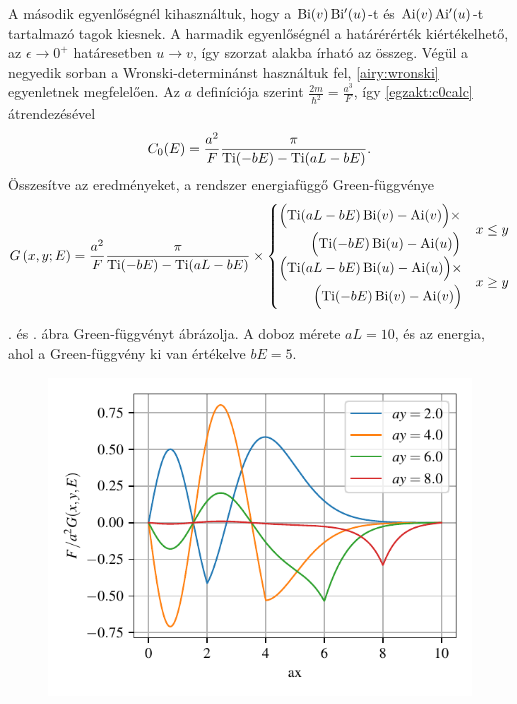 A második egyenlőségnél kihasználtuk, hogy a $\operatorname{Bi}(v)\operatorname{Bi^\prime}(u)$-t és $\operatorname{Ai}(v)\operatorname{Ai^\prime}(u)$-t tartalmazó tagok kiesnek. A harmadik egyenlőségnél a határérérték kiértékelhető, az $\epsilon\to 0^+$ határesetben $u\to v$, így szorzat alakba írható az összeg. Végül a negyedik sorban a Wronski-determinánst használtuk fel, \eqref{airy:wronski} egyenletnek megfelelően. Az $a$ definíciója szerint $\frac{2m}{\hbar^2}=\frac{a^3}{F}$, így \eqref{egzakt:c0calc} átrendezésével
\begin{equation}
	C_0(E) = \frac{a^2}{F}\frac{\pi}{\operatorname{Ti}(-bE)-\operatorname{Ti}(aL-bE)}.
\end{equation}
Összesítve az eredményeket, a rendszer energiafüggő Green-függvénye
\begin{equation}
	G\left(x,y;E\right) = \frac{a^2}{F}\frac{\pi}{\operatorname{Ti}(-bE)-\operatorname{Ti}(aL-bE)}\times
	\begin{cases}
		\begin{split}
			\Bigl(\operatorname{Ti}(aL-bE)\operatorname{Bi}(v)-\operatorname{Ai}(v)\Bigr)\times\\
			\Bigl(\operatorname{Ti}(-bE)\operatorname{Bi}(u)-\operatorname{Ai}(u)\Bigr)
		\end{split}& x \leq y\\
		\begin{split}
			\Bigl(\operatorname{Ti}(aL-bE)\operatorname{Bi}(u)-\operatorname{Ai}(u)\Bigr)\times\\
			\Bigl(\operatorname{Ti}(-bE)\operatorname{Bi}(v)-\operatorname{Ai}(v)\Bigr)
		\end{split}& x \geq y
	\end{cases}
	\label{egzakt:greenfunction}
\end{equation}

. és . ábra  Green-függvényt ábrázolja. A doboz mérete $aL=10$, és az energia, ahol a Green-függvény ki van értékelve $bE=5$.

\begin{figure}[H]
	\centering
	\includegraphics[scale=1]{./figs/1dgreens.pdf}
	\caption[Egy dimenziós Green-függvény]{}
	\label{egzakt:1dgreens}
\end{figure}

